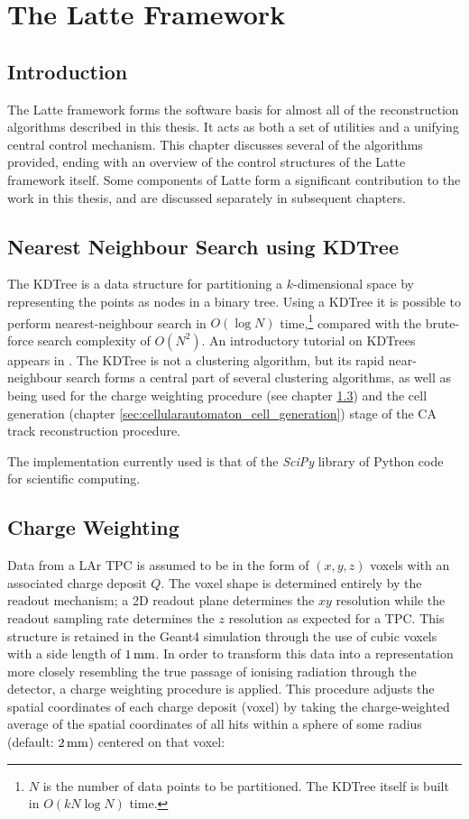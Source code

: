 \chapter{The Latte Framework}\label{chapter:Latte}

\section{Introduction}
The Latte framework forms the software basis for almost all of the reconstruction algorithms described in this thesis. It acts as both a set of utilities and a unifying central control mechanism. This chapter discusses several of the algorithms provided, ending with an overview of the control structures of the Latte framework itself. Some components of Latte form a significant contribution to the work in this thesis, and are discussed separately in subsequent chapters.

\section{Nearest Neighbour Search using \acs{KDTree}}\label{sec:latte_kdtree}
The \ac{KDTree} is a data structure for partitioning a $k$-dimensional space by representing the points as nodes in a binary tree. Using a \ac{KDTree} it is possible to perform nearest-neighbour search in $O(\log N)$ time\citep{Bentley1975},\footnote{$N$ is the number of data points to be partitioned. The KDTree itself is built in $O(kN\log N)$ time.} compared with the brute-force search complexity of $O(N^2)$. An introductory tutorial on \aclp{KDTree} appears in \citep{Moore1991}. The \ac{KDTree} is not a clustering algorithm, but its rapid near-neighbour search forms a central part of several clustering algorithms, as well as being used for the charge weighting procedure (see chapter \ref{sec:cellularautomaton_charge_weighting}) and the cell generation (chapter \ref{sec:cellularautomaton_cell_generation}) stage of the \acl{CA} track reconstruction procedure.

The implementation currently used is that of the \emph{SciPy}\citep{SciPy} library of Python code for scientific computing.

\section{Charge Weighting}\label{sec:cellularautomaton_charge_weighting}
Data from a \ac{LAr TPC} is assumed to be in the form of $(x, y, z)$ voxels with an associated charge deposit $Q$. The voxel shape is determined entirely by the readout mechanism; a 2D readout plane determines the $xy$ resolution while the readout sampling rate determines the $z$ resolution as expected for a \ac{TPC}. This structure is retained in the Geant4 simulation through the use of cubic voxels with a side length of $1\,\mathrm{mm}$. In order to transform this data into a representation more closely resembling the true passage of ionising radiation through the detector, a charge weighting procedure is applied. This procedure adjusts the spatial coordinates of each charge deposit (voxel) by taking the charge-weighted average of the spatial coordinates of all hits within a sphere of some radius (default: $2\,\mathrm{mm}$) centered on that voxel:

